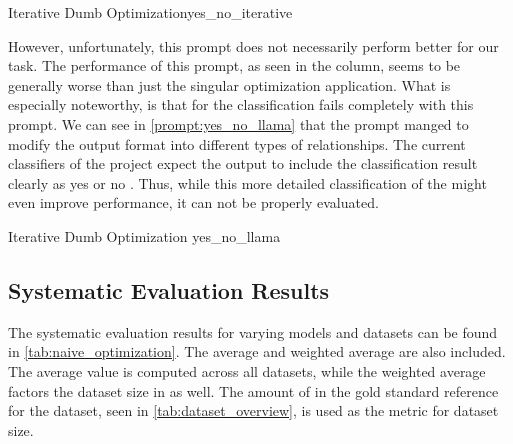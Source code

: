 \begin{prompt}{\KISS Iterative Dumb Optimization}{yes_no_iterative}
    \\
    
\end{prompt}

However, unfortunately, this prompt does not necessarily perform better for our task.
The performance of this prompt, as seen in the  column, seems to be generally worse than just the singular optimization application.
What is especially noteworthy, is that for \llama the classification fails completely with this prompt.
We can see in \autoref{prompt:yes_no_llama} that the prompt manged to modify the output format into different types of relationships.
The current classifiers of the \LiSSA project expect the \LLM output to include the classification result clearly as \textquotesingle yes \textquotesingle or \textquotesingle no \textquotesingle.
Thus, while this more detailed classification of the \LLM might even improve performance, it can not be properly evaluated.

\begin{prompt}{\KISS Iterative Dumb Optimization \llama}{yes_no_llama}
    \\
    
\end{prompt}

\subsection{Systematic Evaluation Results}
\label{subsec:Evaluation:naive_optimization:systematic-evaluation-results}

The systematic evaluation results for varying models and datasets can be found in \autoref{tab:naive_optimization}.
The average and weighted average are also included.
The average value is computed across all datasets, while the weighted average factors the dataset size in as well.
The amount of \TLs in the gold standard reference for the dataset, seen in \autoref{tab:dataset_overview}, is used as the metric for dataset size.

\begin{table}
    \centering
    \renewcommand{\arraystretch}{1.4}
    
    \renewcommand{\arraystretch}{1}
    \caption{Naive prompt optimization approach prompting the model to optimize the classification prompt}
    \label{tab:naive_optimization}
\end{table}

